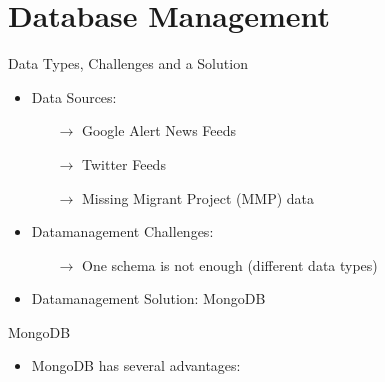 \documentclass{beamer}
\begin{document}
\section{Database Management}

\begin{frame}{Data Types, Challenges and a Solution}
\begin{itemize}
\item Data Sources:

	\begin{itemize}
		\item[$\rightarrow$] Google Alert News Feeds
		\item[$\rightarrow$] Twitter Feeds
		\item[$\rightarrow$] Missing Migrant Project (MMP) data
	\end{itemize}

\item Datamanagement Challenges:

	\begin{itemize}
		\item[$\rightarrow$] One schema is not enough (different data types)
	\end{itemize}
	
\item Datamanagement Solution: MongoDB	

\end{itemize}
\end{frame}



\begin{frame}{MongoDB}
\begin{itemize}
\item MongoDB has several advantages:
\end{itemize}
\end{frame}

\end{document}
